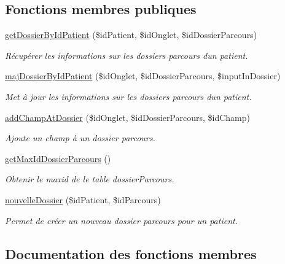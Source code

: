 \subsection*{Fonctions membres publiques}
\begin{DoxyCompactItemize}
\item 
\hyperlink{class_m___dossier_parcours_aaf2f5a9cf7ab3c7f528db1e71ca2def6}{get\+Dossier\+By\+Id\+Patient} (\$id\+Patient, \$id\+Onglet, \$id\+Dossier\+Parcours)
\begin{DoxyCompactList}\small\item\em Récupérer les informations sur les dossiers parcours d\textquotesingle{}un patient. \end{DoxyCompactList}\item 
\hyperlink{class_m___dossier_parcours_a519c29f2f464298c8376dd537af43300}{maj\+Dossier\+By\+Id\+Patient} (\$id\+Onglet, \$id\+Dossier\+Parcours, \$input\+In\+Dossier)
\begin{DoxyCompactList}\small\item\em Met à jour les informations sur les dossiers parcours d\textquotesingle{}un patient. \end{DoxyCompactList}\item 
\hyperlink{class_m___dossier_parcours_a059042f21140b65d74ba70814870a82f}{add\+Champ\+At\+Dossier} (\$id\+Onglet, \$id\+Dossier\+Parcours, \$id\+Champ)
\begin{DoxyCompactList}\small\item\em Ajoute un champ à un dossier parcours. \end{DoxyCompactList}\item 
\hyperlink{class_m___dossier_parcours_a20bb0562e154f912dbfd30e703c22b73}{get\+Max\+Id\+Dossier\+Parcours} ()
\begin{DoxyCompactList}\small\item\em Obtenir le maxid de le table dossier\+Parcours. \end{DoxyCompactList}\item 
\hyperlink{class_m___dossier_parcours_ad7cea95b8946b1d10c6b203566edd6d9}{nouvelle\+Dossier} (\$id\+Patient, \$id\+Parcours)
\begin{DoxyCompactList}\small\item\em Permet de créer un nouveau dossier parcours pour un patient. \end{DoxyCompactList}\end{DoxyCompactItemize}


\subsection{Documentation des fonctions membres}
\mbox{\label{class_m___dossier_parcours_a059042f21140b65d74ba70814870a82f}} 
